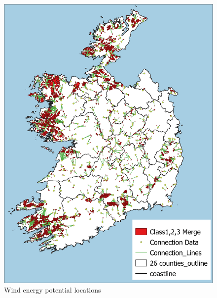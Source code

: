 \documentclass[gmd,manuscript]{copernicus}
\begin{document}
\begin{figure}[!htbp]
 \centering
 \includegraphics[scale=0.6]{figures/WindPotentialMap.png} 
 \caption{Wind energy potential locations}
 \label{fig:wind-onshore-potential}
\end{figure}

\end{document}
